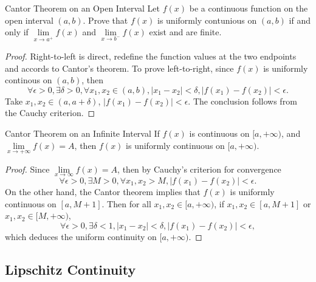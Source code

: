 \begin{example}{Cantor Theorem on an Open Interval}{}
  Let $f(x)$ be a continuous function on the open interval $(a, b)$.
  Prove that $f(x)$ is uniformly contunious on $(a, b)$ if and only if
  $\lim \limits _{x \rightarrow a^+}f(x)$ and $\lim \limits _{x \rightarrow b^-}
  f(x)$ exist and are finite.
\end{example}

\begin{proof}
  Right-to-left is direct, redefine the function values at the two endpoints and
  accords to Cantor's theorem.
  To prove left-to-right, since $f(x)$ is uniformly continous on $(a, b)$,
  then
  \begin{equation}
    \forall \epsilon > 0, \exists \delta > 0, \forall x_1, x_2 \in (a, b),
    |x_1 - x_2| < \delta, |f(x_1) - f(x_2)| < \epsilon.
  \end{equation}
  Take $x_1, x_2 \in (a, a + \delta)$, $|f(x_1) - f(x_2)| < \epsilon$.
  The conclusion follows from the Cauchy criterion.
\end{proof}

\begin{theorem}{Cantor Theorem on an Infinite Interval}{}
  If $f(x)$ is continuous on $[a, +\infty)$,
  and $\lim \limits _{x \rightarrow +\infty} f(x) = A$,
  then $f(x)$ is uniformly continuous on $[a, +\infty)$.
\end{theorem}

\begin{proof}
  Since $\lim \limits _{x \rightarrow \infty} f(x) = A$,
  then by Cauchy's criterion for convergence
  \begin{equation}
    \forall \epsilon > 0, \exists M > 0,
    \forall x_1, x_2 > M, |f(x_1) - f(x_2)| < \epsilon.
  \end{equation}
  On the other hand, the Cantor theorem implies that
  $f(x)$ is uniformly continuous on $[a, M+1]$.
  Then for all $x_1, x_2 \in [a, +\infty)$,
  if $x_1, x_2 \in [a, M+1]$ or $x_1, x_2 \in [M, +\infty)$,
  \begin{equation}
    \forall \epsilon > 0, \exists \delta < 1,
    |x_1 - x_2| < \delta,
    |f(x_1) - f(x_2)| < \epsilon,
  \end{equation}
  which deduces the uniform continuity on $[a, +\infty)$.
\end{proof}

\subsection{Lipschitz Continuity}

